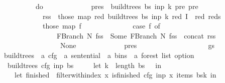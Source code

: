 \begin{isabellebody}
\ \ \ \ \ \ \ \ \ \ do\ {\isacharbraceleft}{\kern0pt}\isanewline
\ \ \ \ \ \ \ \ \ \ \ \ pres\ {\isasymleftarrow}\ build{\isacharunderscore}{\kern0pt}trees{\isacharprime}{\kern0pt}\ bs\ inp\ k{\isacharprime}{\kern0pt}\ pre\ {\isacharbraceleft}{\kern0pt}pre{\isacharbraceright}{\kern0pt}{\isacharsemicolon}{\kern0pt}\isanewline
\ \ \ \ \ \ \ \ \ \ \ \ rss\ {\isasymleftarrow}\ those\ {\isacharparenleft}{\kern0pt}map\ {\isacharparenleft}{\kern0pt}{\isasymlambda}red{\isachardot}{\kern0pt}\ build{\isacharunderscore}{\kern0pt}trees{\isacharprime}{\kern0pt}\ bs\ inp\ k\ red\ {\isacharparenleft}{\kern0pt}I\ {\isasymunion}\ {\isacharbraceleft}{\kern0pt}red{\isacharbraceright}{\kern0pt}{\isacharparenright}{\kern0pt}{\isacharparenright}{\kern0pt}\ reds{\isacharparenright}{\kern0pt}{\isacharsemicolon}{\kern0pt}\isanewline
\ \ \ \ \ \ \ \ \ \ \ \ those\ {\isacharparenleft}{\kern0pt}map\ {\isacharparenleft}{\kern0pt}{\isasymlambda}f{\isachardot}{\kern0pt}\isanewline
\ \ \ \ \ \ \ \ \ \ \ \ \ \ case\ f\ of\isanewline
\ \ \ \ \ \ \ \ \ \ \ \ \ \ \ \ FBranch\ N\ fss\ {\isasymRightarrow}\ Some\ {\isacharparenleft}{\kern0pt}FBranch\ N\ {\isacharparenleft}{\kern0pt}fss\ {\isacharat}{\kern0pt}\ {\isacharbrackleft}{\kern0pt}concat\ rss{\isacharbrackright}{\kern0pt}{\isacharparenright}{\kern0pt}{\isacharparenright}{\kern0pt}\isanewline
\ \ \ \ \ \ \ \ \ \ \ \ \ \ {\isacharbar}{\kern0pt}\ {\isacharunderscore}{\kern0pt}\ {\isasymRightarrow}\ None\isanewline
\ \ \ \ \ \ \ \ \ \ \ \ {\isacharparenright}{\kern0pt}\ pres{\isacharparenright}{\kern0pt}\isanewline
\ \ \ \ \ \ \ \ \ \ {\isacharbraceright}{\kern0pt}\isanewline
\ \ \ \ \ \ \ \ {\isacharparenright}{\kern0pt}\ gs{\isacharparenright}{\kern0pt}{\isacharparenright}{\kern0pt}\isanewline
\ \ \ \ \ \ {\isacharparenright}{\kern0pt}\isanewline
\ \ {\isacharparenright}{\kern0pt}{\isacharparenright}{\kern0pt}{\isachardoublequoteclose}\isanewline
\isanewline
{}\isamarkupfalse%
\ build{\isacharunderscore}{\kern0pt}trees\ {\isacharcolon}{\kern0pt}{\isacharcolon}{\kern0pt}\ {\isachardoublequoteopen}{\isacharprime}{\kern0pt}a\ cfg\ {\isasymRightarrow}\ {\isacharprime}{\kern0pt}a\ sentential\ {\isasymRightarrow}\ {\isacharprime}{\kern0pt}a\ bins\ {\isasymRightarrow}\ {\isacharprime}{\kern0pt}a\ forest\ list\ option{\isachardoublequoteclose}\ \isanewline
\ \ {\isachardoublequoteopen}build{\isacharunderscore}{\kern0pt}trees\ cfg\ inp\ bs\ {\isasymequiv}\isanewline
\ \ \ \ let\ k\ {\isacharequal}{\kern0pt}\ length\ bs\ {\isacharminus}{\kern0pt}\ {}\ in\isanewline
\ \ \ \ let\ finished\ {\isacharequal}{\kern0pt}\ filter{\isacharunderscore}{\kern0pt}with{\isacharunderscore}{\kern0pt}index\ {\isacharparenleft}{\kern0pt}{\isasymlambda}x{\isachardot}{\kern0pt}\ is{\isacharunderscore}{\kern0pt}finished\ cfg\ inp\ x{\isacharparenright}{\kern0pt}\ {\isacharparenleft}{\kern0pt}items\ {\isacharparenleft}{\kern0pt}bs{\isacharbang}{\kern0pt}k{\isacharparenright}{\kern0pt}{\isacharparenright}{\kern0pt}\ in\isanewline

\end{isabellebody}
